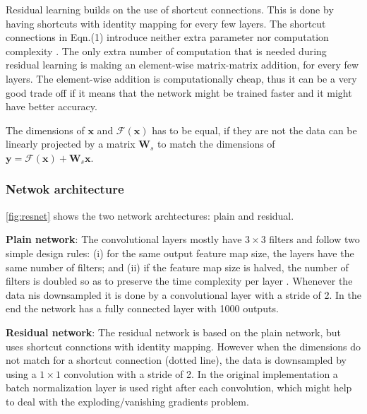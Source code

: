 Residual learning builds on the use of shortcut connections. 
This is done by having shortcuts with identity mapping for every few layers.
\guillemotleft The shortcut connections in Eqn.(1) introduce neither extra parameter nor computation complexity \guillemotright \cite{resnet}.
The only extra number of computation that is needed during residual learning is making an element-wise matrix-matrix addition, for every few layers.
The element-wise addition is computationally cheap, thus it can be a very good trade off if it means that the network might be trained faster and it might have better accuracy.

The dimensions of $\bm{x}$ and $\mathcal{F}(\bm{x})$ has to be equal, if they are not the data can be linearly projected by a matrix $\bm{W}_s$ to match the dimensions of $\bm{y} = \mathcal{F}(\bm{x}) + \bm{W}_s\bm{x}$.

\subsubsection{Netwok architecture}%

\autoref{fig:resnet} shows the two network archtectures: plain and residual.

\textbf{Plain network}: The convolutional layers mostly have $3 \times 3$ filters and follow two simple design rules:
\guillemotleft (i) for the same output
feature map size, the layers have the same number of filters; and
(ii) if the feature map size is halved, the number of filters is doubled so as to preserve the time complexity per layer
\guillemotright\cite{resnet}.
Whenever the data nis downsampled it is done by a convolutional layer with a stride of 2.
In the end the network has a fully connected layer with 1000 outputs.

\textbf{Residual network}: 
The residual network is based on the plain network, but uses shortcut connctions with identity mapping. However when the dimensions do not match for a shortcut connection (dotted line), the data is downsampled by using a $1 \times 1$ convolution with a stride of 2.
In the original implementation a batch normalization layer is used right after each convolution, which might help to deal with the exploding/vanishing gradients problem.

